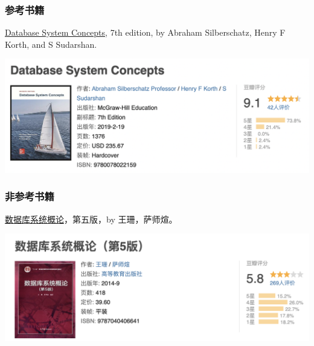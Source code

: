 \documentclass[aspectratio=169, 14pt]{beamer}
\begin{document}
\begin{frame}
	\frametitle{参考书籍}
	\href{https://book.douban.com/subject/30345517/}{Database System Concepts}, 7th edition, by Abraham Silberschatz, Henry F Korth, and S Sudarshan.
	\begin{center}
		\includegraphics[height=.5\paperheight]{image/dsc-book}
	\end{center}
\end{frame}

\begin{frame}
	\frametitle{非参考书籍}
	\href{https://book.douban.com/subject/26317662/}{数据库系统概论}，第五版，by 王珊，萨师煊。
	\begin{center}
		\includegraphics[height=.5\paperheight]{image/book2}
	\end{center}

\end{frame}
\end{document}
